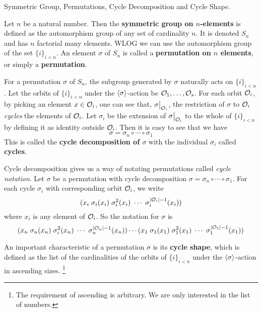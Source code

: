 \documentclass[../../book.tex]{subfiles}
\begin{document}
\begin{dfn} Symmetric Group, Permutations, Cycle Decomposition and Cycle Shape.
    
    Let $n$ be a natural number. 
    Then the \textbf{symmetric group on $n$-elements} is defined as
    the automorphism group of any set of cardinality $n$. 
    It is denoted $S_n$ and has $n$ factorial many elements. 
    WLOG we can use the automorphism group of the set $\{i\}_{i<n}$.
    An element $\sigma$ of $S_n$ is called a \textbf{permutation on $n$ elements},
    or simply a \textbf{permutation}. 
    
    For a permutation $\sigma$ of $S_n$, 
    the subgroup generated by $\sigma$ naturally acts on $\{i\}_{i<n}$. 
    Let the orbits of $\{i\}_{i<n}$ under the $\langle\sigma\rangle$-action 
    be $\mathcal{O}_1,\dots,\mathcal{O}_s$. 
    For each orbit $\mathcal{O}_i$, by picking an element $x \in \mathcal{O}_i$, 
    one can see that, $\res{\sigma}{\O_i}$, 
    the restriction of $\sigma$ to $\mathcal{O}_i$ \emph{cycles} the elements of $\mathcal{O}_i$. 
    Let $\sigma_i$ be the extension
    of $\res{\sigma}{\O_i}$ to the whole of $\{i\}_{i<n}$
    by defining it as identity outside $\mathcal{O}_i$. 
    Then it is easy to see that we have \[
        \sigma = \sigma_n \circ \cdots \circ \sigma_1
    \]
    This is called the \textbf{cycle decomposition of $\sigma$}
    with the individual $\sigma_i$ called \textbf{cycles}. 
    
    Cycle decomposition gives us a way of notating permutations 
    called \emph{cycle notation}.
    Let $\sigma$ be a permutation with cycle decomposition 
    $\sigma = \sigma_n \circ \cdots \circ \sigma_1$. 
    For each cycle $\sigma_i$ with corresponding orbit $\mathcal{O}_i$,
    we write \[
        ( x_i \thickspace \sigma_i(x_i) \thickspace \sigma_i^2(x_i) 
        \thickspace \cdots \thickspace \sigma_i^{|\mathcal{O}_i| - 1}(x_i))
    \]
    where $x_i$ is any element of $\mathcal{O}_i$. 
    So the notation for $\sigma$ is \[
        ( x_n \thickspace \sigma_n(x_n) \thickspace \sigma_i^2(x_n) 
        \thickspace \cdots \thickspace \sigma_n^{|\mathcal{O}_n| - 1}(x_n))
        \cdots 
        ( x_1 \thickspace \sigma_1(x_1) \thickspace \sigma_1^2(x_1) 
        \thickspace \cdots \thickspace \sigma_1^{|\mathcal{O}_1| - 1}(x_1))
    \]
    
    An important characteristic of a permutation $\sigma$ is 
    its \textbf{cycle shape}, which is defined as 
    the list of the cardinalities of the orbits of $\{i\}_{i<n}$ 
    under the $\langle\sigma\rangle$-action in ascending sizes. 
    \footnote{
        The requirement of ascending is arbitrary. 
        We are only interested in the list of numbers. 
    }
    
\end{dfn}
\end{document}
